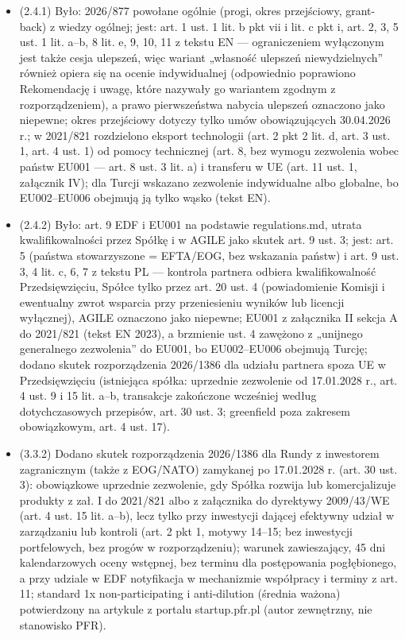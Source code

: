 \documentclass[12pt,a4paper]{report}
\begin{document}
\begin{itemize}
  \item (2.4.1) Było: 2026/877 powołane ogólnie (progi, okres przejściowy, grant-back) z wiedzy ogólnej; jest: art. 1 ust. 1 lit. b pkt vii i lit. c pkt i, art. 2, 3, 5 ust. 1 lit. a–b, 8 lit. e, 9, 10, 11 z tekstu EN — ograniczeniem wyłączonym jest także cesja ulepszeń, więc wariant „własność ulepszeń niewydzielnych” również opiera się na ocenie indywidualnej (odpowiednio poprawiono Rekomendację i uwagę, które nazywały go wariantem zgodnym z rozporządzeniem), a prawo pierwszeństwa nabycia ulepszeń oznaczono jako niepewne; okres przejściowy dotyczy tylko umów obowiązujących 30.04.2026 r.; w 2021/821 rozdzielono eksport technologii (art. 2 pkt 2 lit. d, art. 3 ust. 1, art. 4 ust. 1) od pomocy technicznej (art. 8, bez wymogu zezwolenia wobec państw EU001 — art. 8 ust. 3 lit. a) i transferu w UE (art. 11 ust. 1, załącznik IV); dla Turcji wskazano zezwolenie indywidualne albo globalne, bo EU002–EU006 obejmują ją tylko wąsko (tekst EN).
  \item (2.4.2) Było: art. 9 EDF i EU001 na podstawie regulations.md, utrata kwalifikowalności przez Spółkę i w AGILE jako skutek art. 9 ust. 3; jest: art. 5 (państwa stowarzyszone = EFTA/EOG, bez wskazania państw) i art. 9 ust. 3, 4 lit. c, 6, 7 z tekstu PL — kontrola partnera odbiera kwalifikowalność Przedsięwzięciu, Spółce tylko przez art. 20 ust. 4 (powiadomienie Komisji i ewentualny zwrot wsparcia przy przeniesieniu wyników lub licencji wyłącznej), AGILE oznaczono jako niepewne; EU001 z załącznika II sekcja A do 2021/821 (tekst EN 2023), a brzmienie ust. 4 zawężono z „unijnego generalnego zezwolenia” do EU001, bo EU002–EU006 obejmują Turcję; dodano skutek rozporządzenia 2026/1386 dla udziału partnera spoza UE w Przedsięwzięciu (istniejąca spółka: uprzednie zezwolenie od 17.01.2028 r., art. 4 ust. 9 i 15 lit. a–b, transakcje zakończone wcześniej według dotychczasowych przepisów, art. 30 ust. 3; greenfield poza zakresem obowiązkowym, art. 4 ust. 17).
  \item (3.3.2) Dodano skutek rozporządzenia 2026/1386 dla Rundy z inwestorem zagranicznym (także z EOG/NATO) zamykanej po 17.01.2028 r. (art. 30 ust. 3): obowiązkowe uprzednie zezwolenie, gdy Spółka rozwija lub komercjalizuje produkty z zał. I do 2021/821 albo z załącznika do dyrektywy 2009/43/WE (art. 4 ust. 15 lit. a–b), lecz tylko przy inwestycji dającej efektywny udział w zarządzaniu lub kontroli (art. 2 pkt 1, motywy 14–15; bez inwestycji portfelowych, bez progów w rozporządzeniu); warunek zawieszający, 45 dni kalendarzowych oceny wstępnej, bez terminu dla postępowania pogłębionego, a przy udziale w EDF notyfikacja w mechanizmie współpracy i terminy z art. 11; standard 1x non-participating i anti-dilution (średnia ważona) potwierdzony na artykule z portalu startup.pfr.pl (autor zewnętrzny, nie stanowisko PFR).

\end{itemize}
\end{document}
